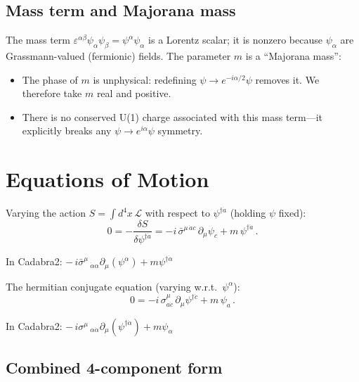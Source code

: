 \documentclass[12pt]{article}
\newcommand{\dal}{\dot{\alpha}}
\newcommand{\sigmabar}{\bar{\sigma}}
\begin{document}
\subsection{Mass term and Majorana mass}

The mass term $\varepsilon^{\alpha\beta}\psi_\alpha\psi_\beta = \psi^\alpha\psi_\alpha$
is a Lorentz scalar; it is nonzero because $\psi_\alpha$ are Grassmann-valued
(fermionic) fields.  The parameter $m$ is a ``Majorana mass'':
\begin{itemize}
  \item The phase of $m$ is unphysical: redefining $\psi \to e^{-i\alpha/2}\psi$
        removes it.  We therefore take $m$ real and positive.
  \item There is no conserved U(1) charge associated with this mass term---it
        explicitly breaks any $\psi\to e^{i\alpha}\psi$ symmetry.
\end{itemize}

\section{Equations of Motion}

Varying the action $S = \int d^4x\,\mathcal{L}$ with respect to
$\psi^{\dagger\dot{a}}$ (holding $\psi$ fixed):
\begin{equation}
  0 = -\frac{\delta S}{\delta\psi^{\dagger\dot{a}}}
    = -i\,\bar{\sigma}^{\mu\,\dot{a}c}\,\partial_\mu\psi_c
      + m\,\psi^{\dagger\dot{a}}\,.
  \tag{36.3--36.4}
\end{equation}

\noindent In Cadabra2: $-\,i \sigmabar^{\mu}\,_{\dal \alpha} \partial_{\mu}\left(\psi^{\alpha}\right) + m \psi^{\dagger \dal}$

\medskip
\noindent The hermitian conjugate equation (varying w.r.t.\ $\psi^\alpha$):
\begin{equation}
  0 = -i\,\sigma^\mu_{a\dot{c}}\,\partial_\mu\psi^{\dagger\dot{c}}
      + m\,\psi_a\,.
  \tag{36.5}
\end{equation}

\noindent In Cadabra2: $-\,i \sigma^{\mu}\,_{\alpha \dal} \partial_{\mu}\left(\psi^{\dagger \dal}\right) + m \psi_{\alpha}$

\subsection{Combined 4-component form}
\end{document}
